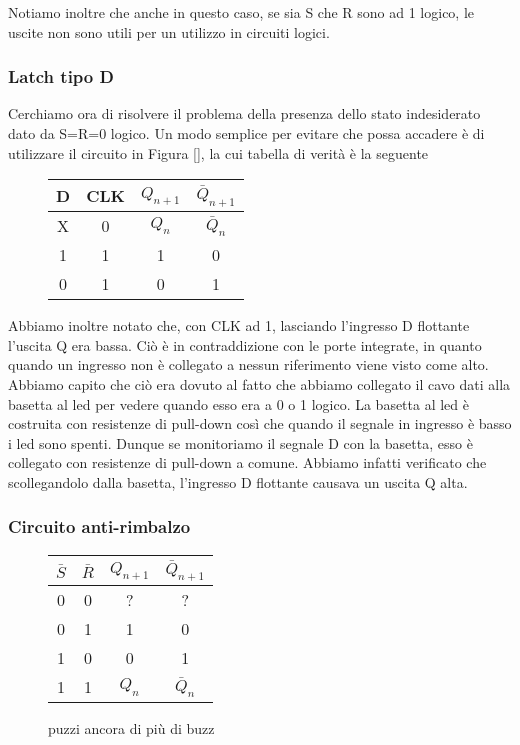 Notiamo inoltre che anche in questo caso, se sia S che R sono ad 1 logico, le uscite non sono utili per un utilizzo in circuiti logici.

\subsubsection*{Latch tipo D}

Cerchiamo ora di risolvere il problema della presenza dello stato indesiderato dato da S=R=0 logico. Un modo semplice per evitare che possa accadere è di utilizzare il circuito in Figura \ref{}, la cui tabella di verità è la seguente

\begin{figure}[H]
		\centering
		{\renewcommand{\arraystretch}{1.1}%
		\begin{tabular}{|c|c|c|c|}
		\hline
		D & CLK & $Q_{n+1}$ & $\bar Q_{n+1}$  \\
		\hline
		X & 0  & $Q_n$ & $\bar Q_n$\\
		\hline
		 1&1 & 1 & 0\\
		\hline
		0&1 & 0  &1\\
		\hline
		\end{tabular}}
		\label{tab11:Latch_D}
        \end{figure}

Abbiamo inoltre notato che, con CLK ad 1, lasciando l'ingresso D flottante l'uscita Q era bassa. Ciò è in contraddizione con le porte integrate, in quanto quando un ingresso non è collegato a nessun riferimento viene visto come alto. Abbiamo capito che ciò era dovuto al fatto che abbiamo collegato il cavo dati alla basetta al led per vedere quando esso era a 0 o 1 logico. La basetta al led è costruita con resistenze di pull-down così che quando il segnale in ingresso è basso i led sono spenti. Dunque se monitoriamo il segnale D con la basetta, esso è collegato con resistenze di pull-down a comune. Abbiamo infatti verificato che scollegandolo dalla basetta, l'ingresso D flottante causava un uscita Q alta.

\subsubsection*{Circuito anti-rimbalzo}


\begin{figure}[H]
		\centering
		{\renewcommand{\arraystretch}{1.1}%
		\begin{tabular}{c|c|c|c}
		$\bar S$ & $\bar R$ & $Q_{n+1}$ & $\bar Q_{n+1}$  \\
		\hline
		0 & 0  & ?&?\\
		\hline
		0&1 & 1 & 0\\
		\hline
		1&0 & 0  &1\\
		\hline
		1&1 & $Q_n$ & $\bar Q_n$\\
		\end{tabular}}
		\label{tab11:antirimb}
		\caption{puzzi ancora di più di buzz}
        \end{figure}

